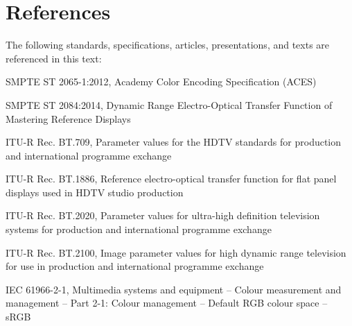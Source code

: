 \numberedformat
\chapter{References}
The following standards, specifications, articles, presentations, and texts are referenced in this text:

SMPTE ST 2065-1:2012, Academy Color Encoding Specification (ACES)

SMPTE ST 2084:2014, Dynamic Range Electro-Optical Transfer Function of Mastering Reference Displays

ITU-R Rec. BT.709, Parameter values for the HDTV standards for production and international programme exchange 

ITU-R Rec. BT.1886, Reference electro-optical transfer function for flat panel displays used in HDTV studio production

ITU-R Rec. BT.2020, Parameter values for ultra-high definition television systems for production and international programme exchange

ITU-R Rec. BT.2100, Image parameter values for high dynamic range television for use in production and international programme exchange

IEC 61966-2-1, Multimedia systems and equipment -- Colour measurement and management -- Part 2-1: Colour management -- Default RGB colour space -- sRGB
